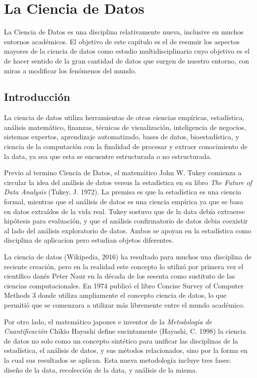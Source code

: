 \documentclass[letterpaper, spanish, 11pt]{report}
\begin{document}
\section{La Ciencia de Datos}
La Ciencia de Datos es una disciplina relativamente nueva, inclusive en muchos entornos académicos. El objetivo de este capítulo es el de resumir los aspectos mayores de la ciencia de datos como estudio multidisciplinario cuyo objetivo es el de hacer sentido de la gran cantidad de datos que surgen de nuestro entorno, con miras a modificar los fenómenos del mundo.

\subsection{Introducción}
La ciencia de datos \cite{zumelMount} utiliza herramientas de otras ciencias empíricas, estadística, análisis matemático, finanzas, técnicas de visualización, inteligencia de negocios, sistemas expertos, aprendizaje automatizado, bases de datos, bioestadística, y ciencia de la computación con la finalidad de procesar y extraer conocimiento de la data, ya sea que esta se encuentre estructurada o no estructurada.

Previo al termino Ciencia de Datos, el matemático John W. Tukey comienza a circular la idea del análisis de datos versus la estadística en su libro \textit{The Future of Data Analysis} (Tukey, J. 1972). La premisa es que la estadística es una ciencia formal, mientras que el análisis de datos es una ciencia empírica ya que se basa en datos extraídos de la vida real. Tukey sostuvo que de la data debía extraerse hipótesis para evaluación, y que el análisis confirmatorio de datos debia coexistir al lado del análisis exploratorio de datos. Ambos se apoyan en la estadística como disciplina de aplicacion pero estudian objetos diferentes.

La ciencia de datos (Wikipedia, 2016) ha resultado para muchos una disciplina de reciente creación, pero en la realidad este concepto lo utilizó por primera vez el científico danés Peter Naur en la década de los sesenta como sustituto de las ciencias computacionales. En 1974 publicó el libro Concise Survey of Computer Methods 3 donde utiliza ampliamente el concepto ciencia de datos, lo que permitió que se comenzara a utilizar más libremente entre el mundo académico.

Por otro lado, el matemático japones e inventor de la \textit{Metodología de Cuantificación} Chikio Hayashi define sucintamente (Hayashi, C. 1998) la ciencia de datos no solo como un concepto sintético para unificar las disciplinas de la estadística, el análisis de datos, y sus métodos relacionados, sino por la forma en la cual sus resultados se aplican. Esta nueva metodología incluye tres fases: diseño de la data, recolección de la data, y análisis de la misma.
\end{document}
